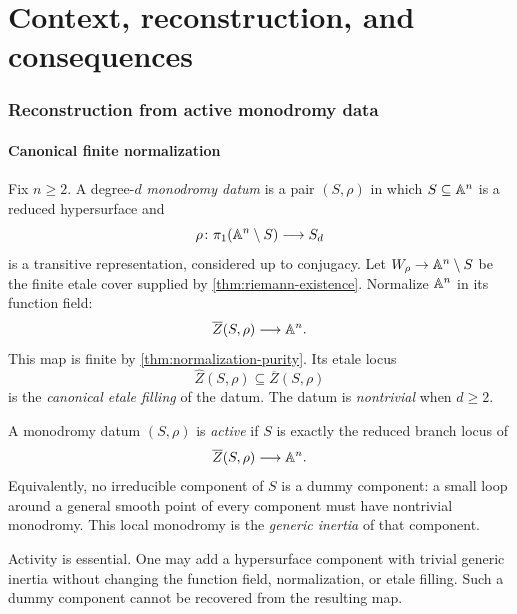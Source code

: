 \part{Context, reconstruction, and consequences}\label{part:context}
\section{Reconstruction from active monodromy data}\label{sec:reconstruction}

\subsection{Canonical finite normalization}

\begin{definition}\label{def:monodromy-datum}
Fix $n\geq2$.  A degree-$d$ \emph{monodromy datum} is a pair $(S,\rho)$ in which $S\subseteq\mathbb A^n$ is a reduced hypersurface and
\[
  \rho\colon\pi_1(\mathbb A^n\setminus S)\longrightarrow S_d
\]
is a transitive representation, considered up to conjugacy.  Let $W_\rho\to\mathbb A^n\setminus S$ be the finite etale cover supplied by \cref{thm:riemann-existence}.  Normalize $\mathbb A^n$ in its function field:
\[
  \overline Z(S,\rho)\longrightarrow\mathbb A^n.
\]
This map is finite by \cref{thm:normalization-purity}.  Its etale locus
\[
  \widehat Z(S,\rho)\subseteq\overline Z(S,\rho)
\]
is the \emph{canonical etale filling} of the datum.  The datum is \emph{nontrivial} when $d\geq2$.
\end{definition}

\begin{definition}\label{def:active}
A monodromy datum $(S,\rho)$ is \emph{active} if $S$ is exactly the reduced branch locus of
\[
  \overline Z(S,\rho)\longrightarrow\mathbb A^n.
\]
Equivalently, no irreducible component of $S$ is a dummy component: a small loop around a general smooth point of every component must have nontrivial monodromy.  This local monodromy is the \emph{generic inertia} of that component.
\end{definition}

\begin{warning}\label{warn:dummy-components}
Activity is essential.  One may add a hypersurface component with trivial generic inertia without changing the function field, normalization, or etale filling.  Such a dummy component cannot be recovered from the resulting map.
\end{warning}

